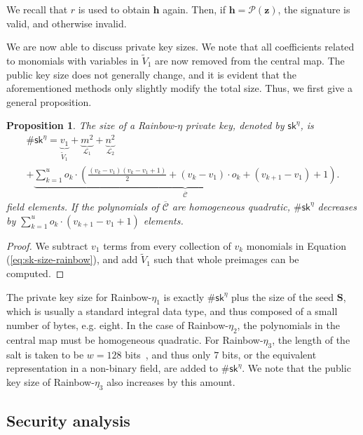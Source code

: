 \documentclass[12pt, a4paper, oneside]{memoir}
\newtheorem{proposition}[theorem]{Proposition}
\theoremstyle{definition}
\begin{document}
We recall that $r$ is used to obtain $\mathbf{h}$ again. Then, if $\mathbf{h} = \mathcal{P}(\mathbf{z})$, the signature is valid, and otherwise invalid.

We are now able to discuss private key sizes. We note that all coefficients related to monomials with variables in $\widetilde{V}_{1}$ are now removed from the central map. The public key size does not generally change, and it is evident that the aforementioned methods only slightly modify the total size. Thus, we first give a general proposition.

\begin{proposition}\label{prop:eta-key-size}
  The size of a Rainbow-$\eta$ private key, denoted by $\mathsf{sk}^{\eta}$, is
  \begin{multline}
    \#\mathsf{sk}^{\eta} = \underbrace{v_{1}}_{\widetilde{V}_{1}}
      + \underbrace{m^{2}}_{\mathcal{L}_{1}}
      + \underbrace{n^{2}}_{\mathcal{L}_{2}} \\
      + \underbrace{\sum_{k = 1}^{u} o_{k} \cdot \left( \frac{(v_{k} - v_{1})(v_{k} - v_{1} + 1)}{2}
        + (v_{k} - v_{1}) \cdot o_{k} + (v_{k + 1} - v_{1}) + 1 \right)}_{\overline{\mathcal{C}}}.
  \end{multline}
  field elements. If the polynomials of $\overline{\mathcal{C}}$ are homogeneous quadratic, $\#\mathsf{sk}^{\eta}$ decreases by $\sum_{k = 1}^{u} o_{k} \cdot (v_{k + 1} - v_{1} + 1)$ elements.
\end{proposition}
\begin{proof}
  We subtract $v_{1}$ terms from every collection of $v_{k}$ monomials in Equation (\ref{eq:sk-size-rainbow}), and add $\widetilde{V}_{1}$ such that whole preimages can be computed.
\end{proof}

The private key size for Rainbow-$\eta_{1}$ is exactly $\#\mathsf{sk}^{\eta}$ plus the size of the seed $\mathbf{S}$, which is usually a standard integral data type, and thus composed of a small number of bytes, e.g. eight. In the case of Rainbow-$\eta_{2}$, the polynomials in the central map must be homogeneous quadratic. For Rainbow-$\eta_{3}$, the length of the salt is taken to be $w = 128$ bits~\cite[p.~11]{Ding:201901}, and thus only $7$ bits, or the equivalent representation in a non-binary field, are added to $\#\mathsf{sk}^{\eta}$. We note that the public key size of Rainbow-$\eta_{3}$ also increases by this amount.

\subsection{Security analysis}\label{subsec:analysis}
\end{document}
